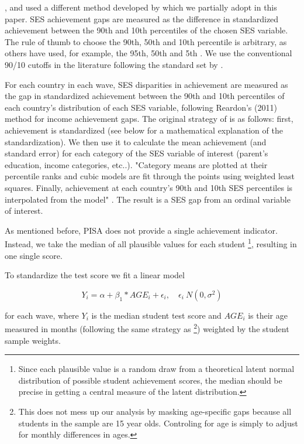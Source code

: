 \documentclass[11pt, a4paper]{article}\usepackage[]{graphicx}\usepackage[]{color}
\begin{document}
\citet{reardon_portilla}, \citet{anna2016} and \citet{anna2016_global} used a different method developed by \citet{reardon2011} which we partially adopt in this paper. SES achievement gaps are measured as the difference in standardized achievement between the 90th and 10th percentiles of the chosen SES variable. The rule of thumb to choose the 90th, 50th and 10th percentile is arbitrary, as others have used, for example, the 95th, 50th and 5th \citep{micklewright}. We use the conventional 90/10 cutoffs in the literature following the standard set by \citet{reardon2011}.

For each country in each wave, SES disparities in achievement are measured as the gap in standardized achievement between the 90th and 10th percentiles of each country’s distribution of each SES variable, following Reardon’s (2011) method for income achievement gaps. The original strategy of \citet{reardon2011} is as follows: first, achievement is standardized (see below for a mathematical explanation of the standardization). We then use it to calculate the mean achievement (and standard error) for each category of the SES variable of interest (parent's education, income categories, etc..). "Category means are plotted at their percentile ranks and cubic models are fit through the points using weighted least squares. Finally, achievement at each country’s 90th and 10th SES percentiles is interpolated from the model" \citep{anna2016_global}. The result is a SES gap from an ordinal variable of interest.

As mentioned before, PISA does not provide a single achievement indicator. Instead, we take the median of all plausible values for each student \footnote{Since each plausible value is a random draw from a theoretical latent normal distribution of possible student achievement scores, the median should be precise in getting a central measure of the latent distribution.}, resulting in one single score.

To standardize the test score we fit a linear model

\begin{equation}
Y_i = \alpha + \beta_1 * AGE_i + \epsilon_i, \quad \epsilon_i ~ N(0, \sigma^2)
\end{equation}

for each wave, where \begin{math}Y_i\end{math} is the median student test score and \begin{math}AGE_i\end{math} is their age measured in months (following the same strategy as \citet{reardon2011} \footnote{This does not mess up our analysis by masking age-specific gaps because all students in the sample are 15 year olds. Controling for age is simply to adjust for monthly differences in ages.}) weighted by the student sample weights.
\end{document}
